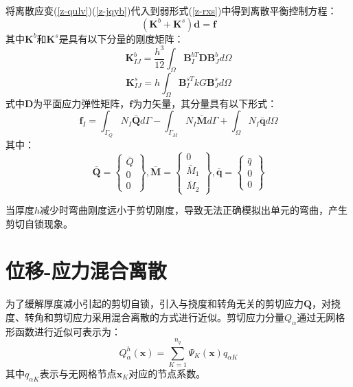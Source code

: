 将离散应变(\ref{z-qulv})(\ref{z-jqyb})代入到弱形式(\ref{z-rxs})中得到离散平衡控制方程：
\begin{equation}
    (\boldsymbol K^b + \boldsymbol K^s) \boldsymbol d = \boldsymbol f
\end{equation}
其中$\boldsymbol K^b$和$\boldsymbol K^s$是具有以下分量的刚度矩阵：
\begin{equation}
    \boldsymbol K^b_{IJ} = \frac{h^3}{12} \int_\Omega \boldsymbol B^{bT}_I \boldsymbol D \boldsymbol B^b_J d\Omega
\end{equation}
\begin{equation}
    \boldsymbol K^s_{IJ} = h \int_\Omega \boldsymbol B^{sT}_I kG \boldsymbol B^s_J d\Omega
\end{equation}
式中$\pmb{D}$为平面应力弹性矩阵，$\pmb{f}$为力矢量，其分量具有以下形式：
\begin{equation}
    \boldsymbol f_I = \int_{\Gamma_Q} N_I \bar{\boldsymbol Q} d\Gamma - \int_{\Gamma_M} N_I \bar{\boldsymbol M} d\Gamma + \int_\Omega N_I \bar{\boldsymbol q} d\Omega
\end{equation}
其中：
\begin{equation}
\bar{\boldsymbol Q} = 
\begin{Bmatrix}
\bar Q \\ 0 \\ 0
\end{Bmatrix},
\bar{\boldsymbol M} =
\begin{Bmatrix}
0 \\ \bar M_1 \\ \bar M_2
\end{Bmatrix},
\bar{\boldsymbol q} =
\begin{Bmatrix}
\bar q \\ 0 \\ 0
\end{Bmatrix}
\end{equation}

当厚度$h$减少时弯曲刚度远小于剪切刚度，导致无法正确模拟出单元的弯曲，产生剪切自锁现象。
\section{位移-应力混合离散}
为了缓解厚度减小引起的剪切自锁，引入与挠度和转角无关的剪切应力$\pmb{Q}$，对挠度、转角和剪切应力采用混合离散的方式进行近似。剪切应力分量$Q_\alpha$通过无网格形函数进行近似可表示为：
\begin{equation}\label{z-jqyl}
    Q^h_\alpha(\boldsymbol x) = \sum_{K=1}^{n_q} \Psi_K(\boldsymbol x) q_{\alpha K}
\end{equation}
其中$q_{\alpha K}$表示与无网格节点$\boldsymbol x_K$对应的节点系数。

